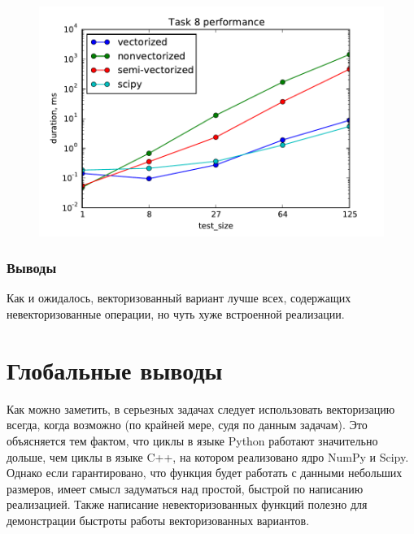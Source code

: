 \documentclass[12pt]{article}
\begin{document}
\begin{figure}[h]
	\begin{center}
		\includegraphics[scale=0.7]{task8}
	\end{center}
\end{figure}

\subsubsection*{Выводы}
Как и ожидалось, векторизованный вариант лучше всех, содержащих невекторизованные операции, но чуть хуже встроенной реализации.

\section{Глобальные выводы}
Как можно заметить, в серьезных задачах следует использовать векторизацию всегда, когда возможно (по крайней мере, судя по данным задачам). Это объясняется тем фактом, что циклы в языке Python работают значительно дольше, чем циклы в языке C++, на котором реализовано ядро NumPy и Scipy. Однако если гарантировано, что функция будет работать с данными небольших размеров, имеет смысл задуматься над простой, быстрой по написанию реализацией. Также написание невекторизованных функций полезно для демонстрации быстроты работы векторизованных вариантов.
\end{document}

